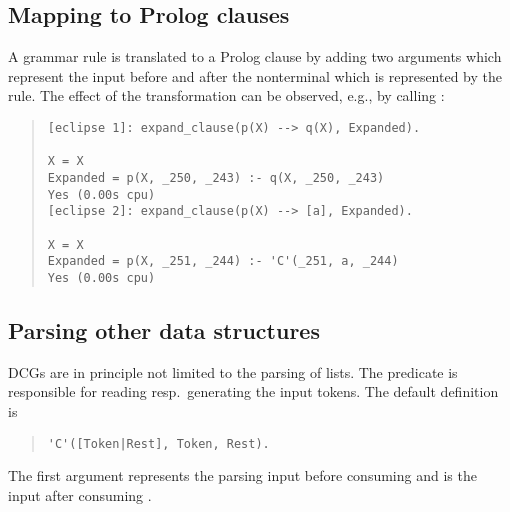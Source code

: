 \subsection{Mapping to Prolog clauses}
A grammar rule is translated to a Prolog clause by adding two arguments
which represent the input before and after the nonterminal which is
represented by the rule.
The effect of the transformation can be observed, e.g., by calling
:
\begin{quote}
\begin{verbatim}
[eclipse 1]: expand_clause(p(X) --> q(X), Expanded).

X = X
Expanded = p(X, _250, _243) :- q(X, _250, _243)
Yes (0.00s cpu)
[eclipse 2]: expand_clause(p(X) --> [a], Expanded).

X = X
Expanded = p(X, _251, _244) :- 'C'(_251, a, _244)
Yes (0.00s cpu)
\end{verbatim}
\end{quote}

\subsection{Parsing other data structures}

DCGs are in principle not limited to the parsing of lists.
The predicate  is responsible
for reading resp.\ generating
the input tokens. The default definition is
\begin{quote}
\begin{verbatim}
'C'([Token|Rest], Token, Rest).
\end{verbatim}
\end{quote}
The first argument represents the parsing input before consuming
 and  is the input after consuming .

